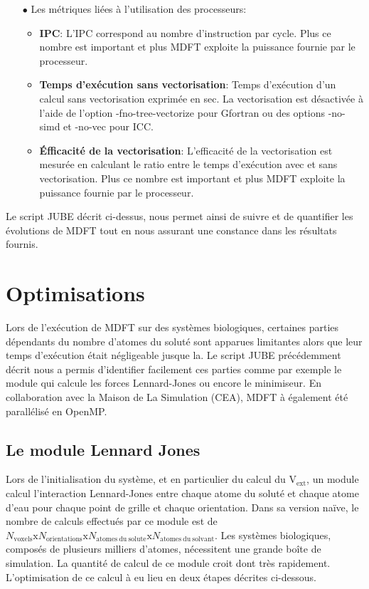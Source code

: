 \begin{itemize}
\item[$\bullet$] Les métriques liées à l'utilisation des processeurs:
  \begin{itemize}
  \item \textbf{IPC}: L'IPC correspond au nombre d'instruction par cycle. Plus ce nombre est important et plus MDFT exploite la puissance fournie par le processeur.
  \item \textbf{Temps d'exécution sans vectorisation}: Temps d’exécution d'un calcul sans vectorisation exprimée en sec. La vectorisation est désactivée à l'aide de l'option -fno-tree-vectorize pour Gfortran ou des options -no-simd et -no-vec pour ICC. 
  \item \textbf{\'Efficacité de la vectorisation}: L'efficacité de la vectorisation est mesurée en calculant le ratio entre le temps d'exécution avec et sans vectorisation. Plus ce nombre est important et plus MDFT exploite la puissance fournie par le processeur.
  \end{itemize}
  \vspace*{1.5ex}%

\end{itemize}

Le script JUBE décrit ci-dessus, nous permet ainsi de suivre et de quantifier les évolutions de MDFT tout en nous assurant une constance dans les résultats fournis.


\section{Optimisations}
Lors de l'exécution de MDFT sur des systèmes biologiques, certaines parties dépendants du nombre d'atomes du soluté sont apparues limitantes alors que leur temps d'exécution était négligeable jusque la. Le script JUBE précédemment décrit nous a permis d'identifier facilement ces parties comme par exemple le module qui calcule les forces Lennard-Jones ou encore le minimiseur. En collaboration avec la Maison de La Simulation (CEA), MDFT à également été parallélisé en OpenMP.


\subsection{Le module Lennard Jones}
Lors de l’initialisation du système, et en particulier du calcul du $\mathrm{V}_\mathrm{ext}$, un module calcul l’interaction Lennard-Jones entre chaque atome du soluté et chaque atome d'eau pour chaque point de grille et chaque orientation. Dans sa version naïve, le nombre de calculs effectués par ce module est de $N_{\mathrm{voxels}}\mathrm{x}N_{\mathrm{orientations}}\mathrm{x}N_{\mathrm{atomes\ du\ solute}}\mathrm{x}N_{\mathrm{atomes\ du\ solvant}}$. Les systèmes biologiques, composés de plusieurs milliers d'atomes, nécessitent une grande boîte de simulation. La quantité de calcul de ce module croit dont très rapidement. L'optimisation de ce calcul à eu lieu en deux étapes décrites ci-dessous.

